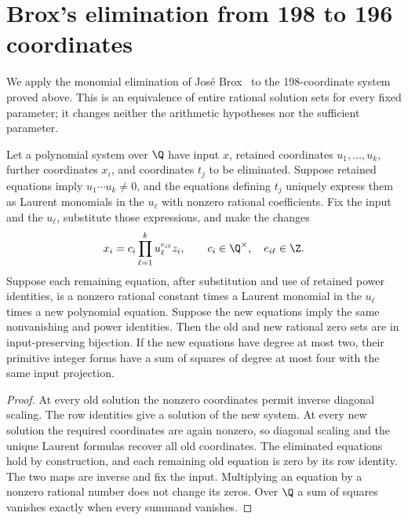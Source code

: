 \section{Brox's elimination from 198 to 196 coordinates}\label{q196:elimination}
We apply the monomial elimination of Jos\'e Brox~\cite{q196:brox}
to the 198-coordinate system proved above. This is an equivalence of
entire rational solution sets for every fixed parameter; it changes
neither the arithmetic hypotheses nor the sufficient parameter.

\begin{lemma}\label{q196:general}
Let a polynomial system over $\Q$ have input $x$, retained coordinates
$u_1,\ldots,u_k$, further coordinates $x_i$, and coordinates $t_j$
to be eliminated. Suppose retained equations imply
$u_1\cdots u_k\ne0$, and the equations defining $t_j$ uniquely express
them as Laurent monomials in the $u_\ell$ with nonzero rational
coefficients. Fix the input and the $u_\ell$, substitute those expressions,
and make the changes
\[
 x_i=c_i\prod_{\ell=1}^k u_\ell^{e_{i\ell}}z_i,
 \qquad c_i\in\Q^\times,\quad e_{i\ell}\in\Z.
\]
Suppose each remaining equation, after substitution and use of retained
power identities, is a nonzero rational constant times a Laurent
monomial in the $u_\ell$ times a new polynomial equation.
Suppose the new equations imply the same nonvanishing and power identities.
Then the old and new rational zero sets are in input-preserving bijection.
If the new equations have degree at most two, their primitive integer
forms have a sum of squares of degree at most four with the same input
projection.
\end{lemma}
\begin{proof}
At every old solution the nonzero coordinates permit inverse diagonal
scaling. The row identities give a solution of the new system.
At every new solution the required coordinates are again nonzero, so
diagonal scaling and the unique Laurent formulas recover all old
coordinates. The eliminated equations hold by construction, and each
remaining old equation is zero by its row identity. The two maps are
inverse and fix the input. Multiplying an equation by a nonzero rational
number does not change its zeros. Over $\Q$ a sum of squares vanishes
exactly when every summand vanishes.
\end{proof}

